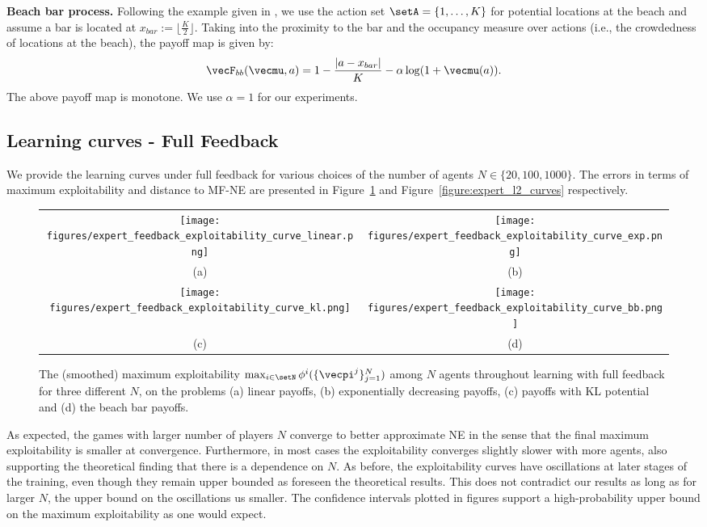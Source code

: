 \textbf{Beach bar process.}
Following the example given in \cite{perrin2020fictitious}, we use the action set $\setA = \{1, \ldots, K \}$ for potential locations at the beach and assume a bar is located at $x_{bar} := \lfloor\frac{K}{2} \rfloor$.
Taking into the proximity to the bar and the occupancy measure over actions (i.e., the crowdedness of locations at the beach), the payoff map is given by:
\begin{align*}
    \vecF_{bb}(\vecmu, a) = 1-\frac{|a - x_{bar}|}{K} - \alpha \log(1 + \vecmu(a)).
\end{align*}
The above payoff map is monotone.
We use $\alpha = 1$ for our experiments.

\subsection{Learning curves - Full Feedback}

We provide the learning curves under full feedback for various choices of the number of agents $N \in \{ 20, 100, 1000 \}$.
The errors in terms of maximum exploitability and distance to MF-NE are presented in Figure~\ref{figure:expert_exp_curves} and Figure~\ref{figure:expert_l2_curves} respectively.

\begin{figure}[h]
\centering
\begin{tabular}{cc}
  \texttt{[image: figures/expert\_feedback\_exploitability\_curve\_linear.png]} &   \texttt{[image: figures/expert\_feedback\_exploitability\_curve\_exp.png]} \\
(a) & (b) \\
\texttt{[image: figures/expert\_feedback\_exploitability\_curve\_kl.png]} &   \texttt{[image: figures/expert\_feedback\_exploitability\_curve\_bb.png]} \\
(c) & (d)
\end{tabular}
\caption{
The (smoothed) maximum exploitability $\max_{i\in\setN} \phi^i(\{\vecpi^j\}_{j=1}^N)$ among $N$ agents throughout learning with full feedback for three different $N$, on the problems (a) linear payoffs, (b) exponentially decreasing payoffs, (c) payoffs with KL potential and (d) the beach bar payoffs.
}
\label{figure:expert_exp_curves}
\end{figure}

As expected, the games with larger number of players $N$ converge to better approximate NE in the sense that the final maximum exploitability is smaller at convergence.
Furthermore, in most cases the exploitability converges slightly slower with more agents, also supporting the theoretical finding that there is a dependence on $N$.
As before, the exploitability curves have oscillations at later stages of the training, even though they remain upper bounded as foreseen the theoretical results.
This does not contradict our results as long as for larger $N$, the upper bound on the oscillations us smaller.
The confidence intervals plotted in figures support a high-probability upper bound on the maximum exploitability as one would expect.


